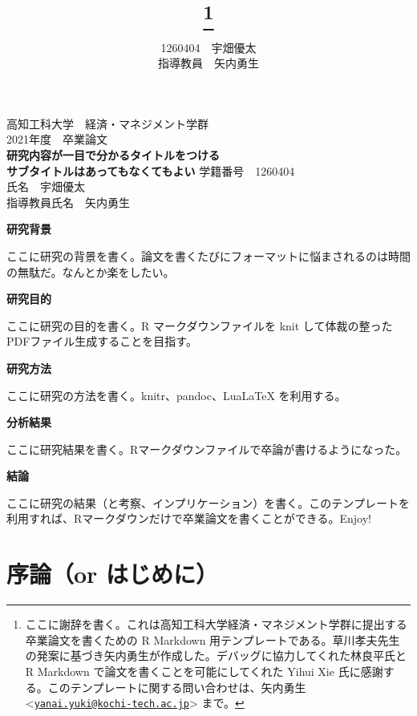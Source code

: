 \documentclass[lualatex,
               a4paper,
               10.5pt,
               ja=standard,
               jafont=ipaex]{bxjsarticle}
\title{\vspace{-28pt}{\Large\gtfamily\bfseries 研究内容が一目で分かるタイトルをつける}\thanks{ここに謝辞を書く。これは高知工科大学経済・マネジメント学群に提出する卒業論文を書くための R Markdown 用テンプレートである。草川孝夫先生の発案に基づき矢内勇生が作成した。デバッグに協力してくれた林良平氏とR Markdown で論文を書くことを可能にしてくれた Yihui Xie 氏に感謝する。このテンプレートに関する問い合わせは、矢内勇生 \textless{}\href{mailto:yanai.yuki@kochi-tech.ac.jp}{\nolinkurl{yanai.yuki@kochi-tech.ac.jp}}\textgreater{} まで。}}
\subtitle{\large\gtfamily\bfseries \vskip 0.4em サブタイトルはあってもなくてもよい\vspace{-8pt}}
\author{\large 1260404　宇畑優太\\ 指導教員　矢内勇生}
\date{} %
\begin{document}
\thispagestyle{empty}
\begin{center}
\Large
高知工科大学　経済・マネジメント学群 \\
2021年度　卒業論文\\
\vspace{36truemm}
{\LARGE\gtfamily\bfseries 研究内容が一目で分かるタイトルをつける}\\
\vspace{4truemm}
  {\Large\gtfamily\bfseries サブタイトルはあってもなくてもよい}
\vfill
学籍番号　1260404 \\
\vspace{4truemm}
氏名　宇畑優太 \\
\vspace{8truemm}
指導教員氏名　矢内勇生
\end{center}

\newpage
\maketitle
\thispagestyle{empty} %

\noindent
\textbf{研究背景}

ここに研究の背景を書く。論文を書くたびにフォーマットに悩まされるのは時間の無駄だ。なんとか楽をしたい。

\vspace{4truemm}
\noindent
\textbf{研究目的}

ここに研究の目的を書く。R マークダウンファイルを knit して体裁の整ったPDFファイル生成することを目指す。

\vspace{4truemm}
\noindent
\textbf{研究方法}

ここに研究の方法を書く。knitr、pandoc、LuaLaTeX を利用する。

\vspace{4truemm}
\noindent
\textbf{分析結果}

ここに研究結果を書く。Rマークダウンファイルで卒論が書けるようになった。

\vspace{4truemm}
\noindent
\textbf{結論}

ここに研究の結果（と考察、インプリケーション）を書く。このテンプレートを利用すれば、Rマークダウンだけで卒業論文を書くことができる。Enjoy!

\newpage
{}

\section{序論（or はじめに）}\label{ux5e8fux8ad6or-ux306fux3058ux3081ux306b}
\end{document}
